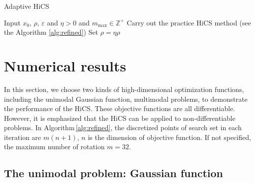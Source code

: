 \documentclass[mathpazo]{csam}
\theoremstyle{remark}
\begin{document}
\begin{algorithm}[H]
	\caption{Adaptive HiCS}
	\label{alg:AHiCS}
\begin{algorithmic}[1]
	\STATE Input $x_0$, $\rho$, $\varepsilon$ and $\eta>0$ and $m_{\max}\in \mathbb{Z}^+$
	\IF {$\rho>\varepsilon$}
	\STATE Carry out the practice HiCS method (see the Algorithm \ref{alg:refined})
			\STATE Set $\rho=\eta \rho$
		\ENDIF
\ENDIF
\end{algorithmic}
\end{algorithm}



\section{Numerical results}
\label{sec:experiment}

In this section, we choose two kinds of high-dimensional optimization functions,
including the unimodal Gaussian function, multimodal problems, to demonstrate
the performance of the HiCS.
These objective functions are all differentiable. However, it is
emphasized that the HiCS can be applied to non-differentiable problems. 
In Algorithm\,\ref{alg:refined}, the discretized points of 
search set in each iteration are $m(n+1)$, $n$ is the dimension
of objective function. If not specified, the maximum number of
rotation $m=32$.

\subsection{The unimodal problem: Gaussian function}
\label{subsec:gauss}
\end{document}
